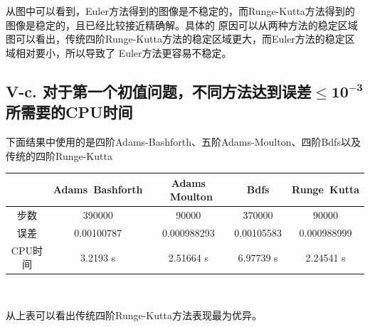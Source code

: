\documentclass[twoside,a4paper]{article}
\begin{document}
\raggedright
\hspace{0.8em}
从图中可以看到，Euler方法得到的图像是不稳定的，而Runge-Kutta方法得到的图像是稳定的，且已经比较接近精确解。具体的
原因可以从两种方法的稳定区域图可以看出，传统四阶Runge-Kutta方法的稳定区域更大，而Euler方法的稳定区域相对要小，所以导致了
Euler方法更容易不稳定。

\newpage
\subsection*{V-c. 对于第一个初值问题，不同方法达到误差$\mathbf{\leq10^{-3}}$所需要的CPU时间}
\hspace{0.8em}
下面结果中使用的是四阶Adams-Bashforth、五阶Adams-Moulton、四阶Bdfs以及传统的四阶Runge-Kutta
\\[12pt]
\centering
\renewcommand{\arraystretch}{2}
\begin{tabular}{|c|c|c|c|c|}
    \hline
            & \textbf{Adams}\ \textbf{Bashforth} & \textbf{Adams} \ \textbf{Moulton} & \textbf{Bdfs} & \textbf{Runge}\ \textbf{Kutta} \\
    \hline
    步数    & 390000                             & 90000                             & 370000        & 90000                          \\
    \hline
    误差    & 0.00100787                         & 0.000988293                       & 0.00105583    & 0.000988999                    \\
    \hline
    CPU时间 & 3.2193 s                           & 2.51664 s                         & 6.97739 s     & 2.24541 s                      \\
    \hline
\end{tabular}
\\[12pt]
\raggedright
从上表可以看出传统四阶Runge-Kutta方法表现最为优异。
\end{document}
